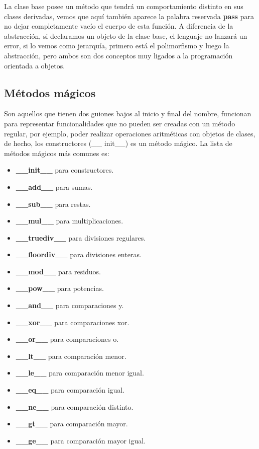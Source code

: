 La clase base posee un método que tendrá un comportamiento distinto en sus clases derivadas, vemos que aquí también aparece la palabra reservada \textbf{pass} para no dejar completamente vacío el cuerpo de esta función. A diferencia de la abstracción, si declaramos un objeto de la clase base, el lenguaje no lanzará un error, si lo vemos como jerarquía, primero está el polimorfismo y luego la abstracción, pero ambos son dos conceptos muy ligados a la programación orientada a objetos.


\subsection{Métodos mágicos}

Son aquellos que tienen dos guiones bajos al inicio y final del nombre, funcionan para representar funcionalidades que no pueden ser creadas con un método regular, por ejemplo, poder realizar operaciones aritméticas con objetos de clases, de hecho, los constructores (\_\_ init\_\_) es un método mágico. La lista de métodos mágicos más comunes es:
\begin{itemize}
	\item \textbf{\_\_init\_\_} para constructores.
	\item \textbf{\_\_add\_\_} para sumas.
	\item \textbf{\_\_sub\_\_} para restas.
	\item \textbf{\_\_mul\_\_} para multiplicaciones.
	\item \textbf{\_\_truediv\_\_} para divisiones regulares.
	\item \textbf{\_\_floordiv\_\_} para divisiones enteras.
	\item \textbf{\_\_mod\_\_} para residuos.
	\item \textbf{\_\_pow\_\_} para potencias.
	\item \textbf{\_\_and\_\_} para comparaciones y.
	\item \textbf{\_\_xor\_\_} para comparaciones xor.
	\item \textbf{\_\_or\_\_} para comparaciones o.
	\item \textbf{\_\_lt\_\_} para comparación menor.
	\item \textbf{\_\_le\_\_} para comparación menor igual.
	\item \textbf{\_\_eq\_\_} para comparación igual.
	\item \textbf{\_\_ne\_\_} para comparación distinto.
	\item \textbf{\_\_gt\_\_} para comparación mayor.
	\item \textbf{\_\_ge\_\_} para comparación mayor igual.
\end{itemize}


